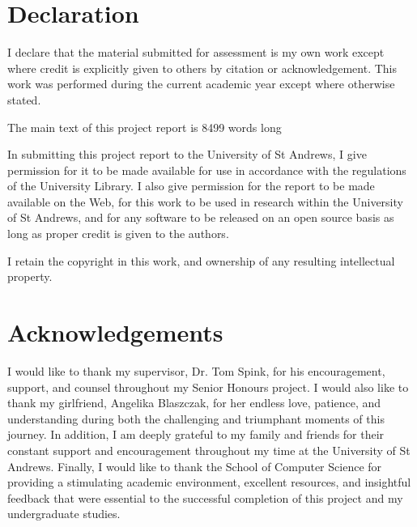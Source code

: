 \chapter*{Declaration}
I declare that the material submitted for assessment is my own work except
where credit is explicitly given to others by citation or acknowledgement. This
work was performed during the current academic year except where otherwise
stated.

The main text of this project report is 8499 words long

In submitting this project report to the University of St Andrews, I give
permission for it to be made available for use in accordance with the
regulations of the University Library. I also give permission for the report to
be made available on the Web, for this work to be used in research within the
University of St Andrews, and for any software to be released on an open source
basis as long as proper credit is given to the authors.


I retain the copyright in this work, and ownership of any resulting intellectual property.

{\let\clearpage\relax \chapter*{Acknowledgements}}
I would like to thank my supervisor, Dr. Tom Spink, for his encouragement, support, and counsel throughout my Senior Honours project. I would also like to thank my girlfriend, Angelika Blaszczak, for her endless love, patience, and understanding during both the challenging and triumphant moments of this journey. In addition, I am deeply grateful to my family and friends for their constant support and encouragement throughout my time at the University of St Andrews. Finally, I would like to thank the School of Computer Science for providing a stimulating academic environment, excellent resources, and insightful feedback that were essential to the successful completion of this project and my undergraduate studies.
